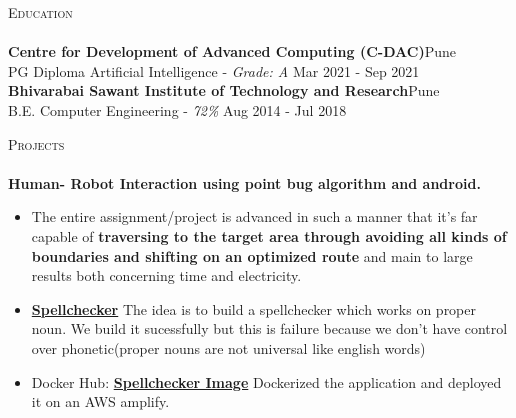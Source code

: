 \documentclass[a4paper]{article}
\newcommand{\lineunder} {
    \vspace*{-8pt} \\
    \hspace*{-18pt} \hrulefill \\
}
\newcommand{\header} [1] {
    {\hspace*{-18pt}\vspace*{6pt} \textsc{#1}}
    \vspace*{-6pt} \lineunder
}
\begin{document}
\vspace*{2mm}

\header{Education}
\textbf{Centre for Development of Advanced Computing (C-DAC)}\hfill Pune\\
PG Diploma Artificial Intelligence - \textit{Grade: A} \hfill Mar 2021 - Sep 2021\\
\vspace{2mm}
\textbf{Bhivarabai Sawant Institute of Technology and Research}\hfill Pune\\
B.E. Computer Engineering - \textit{72\%} \hfill Aug 2014 - Jul 2018\\
\vspace{2mm}

\header{Projects}


{\textbf{Human- Robot Interaction using point bug algorithm and android.}}
\begin{itemize} \itemsep 1pt
    \item The entire assignment/project is advanced in such a manner that it's far capable of \textbf{traversing to the target area through avoiding all kinds of boundaries and shifting on an optimized route} and main to large results both concerning time and electricity.
          \\
\end{itemize}
\vspace*{2mm}

\begin{itemize} \itemsep 1pt
    \item \href{https://github.com/krushna2500/spellchecker}{\textbf{Spellchecker}}
    The idea is to build a spellchecker which works on proper noun. We build it sucessfully but this is failure because we don't have control over phonetic(proper nouns are not universal like english words)
    \item Docker Hub: \href{https://hub.docker.com/r/krushna2500/spellchecker}{\textbf{Spellchecker Image}} Dockerized the application and deployed it on an AWS amplify.
\end{itemize}
\vspace*{2mm}
\end{document}
